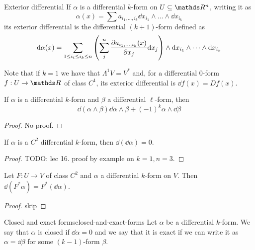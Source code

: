 \documentclass[12pt]{extarticle}
\begin{document}
\begin{definition}{Exterior differential}{}
	If $\alpha$ is a differential $k$-form on $U \subseteq \R^n$, writing it as
	\begin{equation}
		\alpha(x) = \sum a_{i_1, \dots, i_k} \dd x_{i_1} \land \dots \land \dd x_{i_k}
	\end{equation}
	its exterior differential is the differential $(k+1)$-form defined as
	\begin{equation}
		\dd \alpha(x) = \sum_{1 \leq i_i \leq i_k \leq n} \left( \sum_j^n \pdv{a_{i_1, \dots, i_k}(x)}{x_j} \dd x_j \right)
		\land \dd x_{i_1} \land \dots \land \dd x_{i_k}
	\end{equation}
\end{definition}

Note that if $k = 1$ we have that $\Lambda^1 V = V^*$ and, for a differential $0$-form $f: U \to \R$
of class $C^1$, its exterior differential is $\dd f(x) = Df(x)$.

\begin{proposition}{}{}
	If $\alpha$ is a differential $k$-form and $\beta$ a differential $\ell$-form, then
	\begin{equation}
		\dd(\alpha \land \beta) \dd \alpha \land \beta + (-1)^k \alpha \land \dd \beta
	\end{equation}
\end{proposition}

\begin{proof}
	No proof.
\end{proof}

\begin{proposition}{}{}
	If $\alpha$ is a $C^2$ differential $k$-form, then $\dd(\dd \alpha) = 0$.
\end{proposition}
\begin{proof}
	TODO: lec 16.
	proof by example on $k=1, n=3$.
\end{proof}

\begin{proposition}{}{}
	Let $F: U \to V$ of class $C^2$ and $\alpha$ a differential $k$-form on $V$.
	Then $\dd(F^* \alpha) = F^*(\dd \alpha)$.
\end{proposition}

\begin{proof}
	skip
\end{proof}

\begin{definition}{Closed and exact forms}{closed-and-exact-forms}
	Let $\alpha$ be a differential $k$-form.
	We say that $\alpha$ is closed if $\dd \alpha = 0$ and we say that it is exact if we can write it
	as $\alpha = \dd \beta$ for some $(k-1)$-form $\beta$.
\end{definition}
\end{document}
